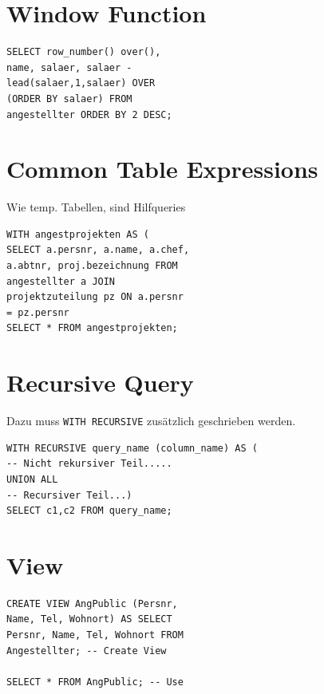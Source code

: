 \documentclass[10pt,landscape,a4paper]{scrartcl}
\begin{document}
\begin{multicols*}{5}
\section{Window Function}
\begin{lstlisting}
SELECT row_number() over(),
name, salaer, salaer - 
lead(salaer,1,salaer) OVER 
(ORDER BY salaer) FROM 
angestellter ORDER BY 2 DESC;
\end{lstlisting}

\section{Common Table Expressions}
Wie temp. Tabellen, sind Hilfqueries
\begin{lstlisting}
WITH angestprojekten AS (
SELECT a.persnr, a.name, a.chef, 
a.abtnr, proj.bezeichnung FROM
angestellter a JOIN 
projektzuteilung pz ON a.persnr 
= pz.persnr
SELECT * FROM angestprojekten;
\end{lstlisting}
\section{Recursive Query}
Dazu muss \texttt{WITH RECURSIVE} zusätzlich geschrieben werden.
\begin{lstlisting}
WITH RECURSIVE query_name (column_name) AS (
-- Nicht rekursiver Teil.....
UNION ALL 
-- Recursiver Teil...) 
SELECT c1,c2 FROM query_name;

\end{lstlisting}
\section{View}
\begin{lstlisting}
CREATE VIEW AngPublic (Persnr, 
Name, Tel, Wohnort) AS SELECT 
Persnr, Name, Tel, Wohnort FROM 
Angestellter; -- Create View

SELECT * FROM AngPublic; -- Use
\end{lstlisting}
\columnbreak


\end{multicols*}
\end{document}
